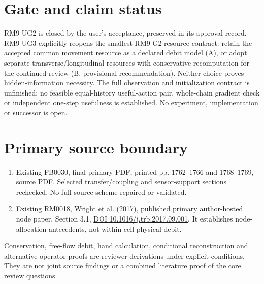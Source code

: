\documentclass[10pt,a4paper]{article}
\begin{document}
\section{Gate and claim status}
RM9-UG2 is closed by the user's acceptance, preserved in its approval record.
RM9-UG3 explicitly reopens the smallest RM9-G2 resource contract:
retain the accepted common movement resource as a declared debit model (A), or
adopt separate transverse/longitudinal resources with conservative recomputation
for the continued review (B, provisional recommendation).
Neither choice proves hidden-information necessity. The full observation and
initialization contract is unfinished; no feasible equal-history useful-action
pair, whole-chain gradient check or independent one-step usefulness is established.
No experiment, implementation or successor is open.

\section*{Primary source boundary}
\begin{enumerate}
\item Existing FB0030, final primary PDF, printed pp. 1762--1766 and 1768--1769,
\href{https://repository.tudelft.nl/file/File_2c4359e7-5e5a-4651-964f-6f3610ab89ae}{source PDF}.
Selected transfer/coupling and sensor-support sections rechecked. No full source
scheme repaired or validated.
\item Existing RM0018, Wright et al. (2017), published primary author-hosted
node paper, Section 3.1,
\href{https://doi.org/10.1016/j.trb.2017.09.001}{DOI 10.1016/j.trb.2017.09.001}.
It establishes node-allocation antecedents, not within-cell physical debit.
\end{enumerate}
\noindent Conservation, free-flow debit, hand calculation, conditional
reconstruction and alternative-operator proofs are reviewer derivations under
explicit conditions. They are not joint source findings or a combined
literature proof of the core review questions.
\end{document}
